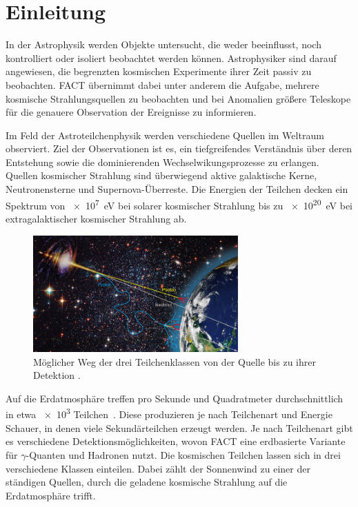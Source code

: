 \chapter{Einleitung}
In der Astrophysik werden Objekte untersucht, die weder beeinflusst, noch kontrolliert oder isoliert beobachtet werden können.
Astrophysiker sind darauf angewiesen, die begrenzten kosmischen Experimente ihrer Zeit passiv zu beobachten. 
FACT übernimmt dabei unter anderem die Aufgabe, mehrere kosmische Strahlungsquellen zu beobachten und bei Anomalien größere Teleskope für die genauere Observation der Ereignisse zu informieren. 

Im Feld der Astroteilchenphysik werden verschiedene Quellen im Weltraum observiert.
Ziel der Observationen ist es, ein tiefgreifendes Verständnis über deren Entstehung sowie die dominierenden Wechselwikungsprozesse zu erlangen. 
Quellen kosmischer Strahlung sind überwiegend aktive galaktische Kerne, Neutronensterne und Supernova-Überreste. 
Die Energien der Teilchen decken ein Spektrum von \SI{e7}{\electronvolt} bei solarer kosmischer Strahlung bis zu \SI{e20}{\electronvolt} bei extragalaktischer kosmischer Strahlung ab. 

\begin{figure}
  \centering
  \includegraphics[width=0.7\textwidth]{./images/sources-detection.jpg}
  \caption{Möglicher Weg der drei Teilchenklassen von der Quelle bis zu ihrer Detektion \cite{overview-detec}.}
\end{figure}

Auf die Erdatmosphäre treffen pro Sekunde und Quadratmeter durchschnittlich in etwa \num{e3} Teilchen~\cite{gaisser}.
Diese produzieren je nach Teilchenart und Energie Schauer, in denen viele Sekundärteilchen erzeugt werden. 
Je nach Teilchenart gibt es verschiedene Detektionsmöglichkeiten, wovon FACT eine erdbasierte Variante für $\gamma$-Quanten und Hadronen nutzt. 
Die kosmischen Teilchen lassen sich in drei verschiedene Klassen einteilen. 
Dabei zählt der Sonnenwind zu einer der ständigen Quellen, durch die geladene kosmische Strahlung auf die Erdatmosphäre trifft.

